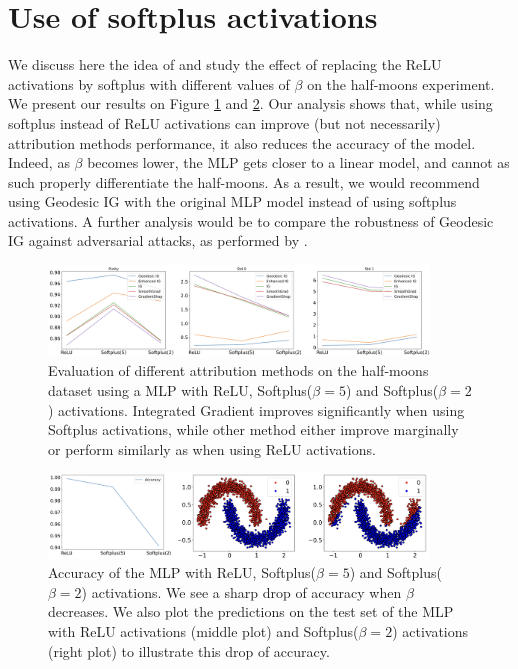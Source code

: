 \section{Use of softplus activations}
\label{app:softplus}

We discuss here the idea of \citet{dombrowski2019explanations} and study the effect of replacing the ReLU activations by softplus with different values of $\beta$ on the half-moons experiment. We present our results on Figure \ref{fig:softplus} and \ref{fig:softplus_acc}. Our analysis shows that, while using softplus instead of ReLU activations can improve (but not necessarily) attribution methods performance, it also reduces the accuracy of the model. Indeed, as $\beta$ becomes lower, the MLP gets closer to a linear model, and cannot as such properly differentiate the half-moons. As a result, we would recommend using Geodesic IG with the original MLP model instead of using softplus activations. A further analysis would be to compare the robustness of Geodesic IG against adversarial attacks, as performed by \citet{dombrowski2019explanations}.

\begin{figure}[ht]
\vskip 0.2in
\begin{center}
\centerline{\includegraphics[width=0.9\textwidth]{figures/softplus.png}}
\caption{Evaluation of different attribution methods on the half-moons dataset using a MLP with ReLU, Softplus($\beta = 5$) and Softplus($\beta = 2$) activations. Integrated Gradient improves significantly when using Softplus activations, while other method either improve marginally or perform similarly as when using ReLU activations.}
\label{fig:softplus}
\end{center}
\vskip -0.2in
\end{figure}

\begin{figure}[ht]
\vskip 0.2in
\begin{center}
\centerline{\includegraphics[width=0.9\textwidth]{figures/softplus_acc.png}}
\caption{Accuracy of the MLP with ReLU, Softplus($\beta = 5$) and Softplus($\beta = 2$) activations. We see a sharp drop of accuracy when $\beta$ decreases. We also plot the predictions on the test set of the MLP with ReLU activations (middle plot) and Softplus($\beta = 2$) activations (right plot) to illustrate this drop of accuracy.}
\label{fig:softplus_acc}
\end{center}
\vskip -0.2in
\end{figure}

